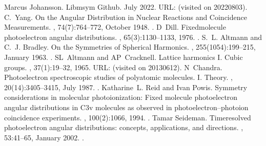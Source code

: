\documentclass[letterpaper,table,10pt,english]{jupyterBook}
\begin{document}
\begin{sphinxthebibliography}{10}
\sphinxAtStartPar
Marcus Johansson. Libmsym Github. July 2022. URL:  (visited on 2022\sphinxhyphen{}08\sphinxhyphen{}03).
\sphinxAtStartPar
C. Yang. On the Angular Distribution in Nuclear Reactions and Coincidence Measurements. , 74(7):764–772, October 1948. .
\sphinxAtStartPar
D Dill. Fixed\sphinxhyphen{}molecule photoelectron angular distributions. , 65(3):1130–1133, 1976. .
\sphinxAtStartPar
S. L. Altmann and C. J. Bradley. On the Symmetries of Spherical Harmonics. , 255(1054):199–215, January 1963. .
\sphinxAtStartPar
SL Altmann and AP Cracknell. Lattice harmonics I. Cubic groups. , 37(1):19–32, 1965. URL:  (visited on 2013\sphinxhyphen{}06\sphinxhyphen{}12).
\sphinxAtStartPar
N Chandra. Photoelectron spectroscopic studies of polyatomic molecules. I. Theory. , 20(14):3405–3415, July 1987. .
\sphinxAtStartPar
Katharine L. Reid and Ivan Powis. Symmetry considerations in molecular photoionization: Fixed molecule photoelectron angular distributions in C3v molecules as observed in photoelectron–photoion coincidence experiments. , 100(2):1066, 1994. .
\sphinxAtStartPar
Tamar Seideman. Time\sphinxhyphen{}resolved photoelectron angular distributions: concepts, applications, and directions. , 53:41–65, January 2002. .

\end{sphinxthebibliography}
\end{document}
